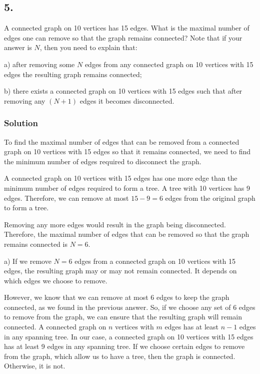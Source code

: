 \documentclass[a4paper]{article}
\begin{document}
\subsection*{5.}
A connected graph on 10 vertices has 15 edges. What is the maximal number of edges one can remove so that the graph remains connected? Note that if your answer is \(N\), then you need to explain that:
\\
\par a) after removing some \(N\) edges from any connected graph on 10 vertices with 15 edges the resulting graph remains connected;
\\
\par b) there exists a connected graph on 10 vertices with 15 edges such that after removing any \((N + 1)\) edges it becomes disconnected.

\subsubsection*{Solution}
\par To find the maximal number of edges that can be removed from a connected graph on 10 vertices with 15 edges so that it remains connected, we need to find the minimum number of edges required to disconnect the graph. \\
\par A connected graph on 10 vertices with 15 edges has one more edge than the minimum number of edges required to form a tree. A tree with 10 vertices has 9 edges. Therefore, we can remove at most \(15 - 9 = 6\) edges from the original graph to form a tree. \\
\par Removing any more edges would result in the graph being disconnected. Therefore, the maximal number of edges that can be removed so that the graph remains connected is \(N=6\). \\
\par a) If we remove \(N=6\) edges from a connected graph on 10 vertices with 15 edges, the resulting graph may or may not remain connected. It depends on which edges we choose to remove. \\
\par However, we know that we can remove at most 6 edges to keep the graph connected, as we found in the previous answer. So, if we choose any set of 6 edges to remove from the graph, we can ensure that the resulting graph will remain connected. A connected graph on \(n\) vertices with \(m\) edges has at least \(n-1\) edges in any spanning tree. In our case, a connected graph on 10 vertices with 15 edges has at least 9 edges in any spanning tree. If we choose certain edges to remove from the graph, which allow us to have a tree, then the graph is connected. Otherwise, it is not.\\
\end{document}
